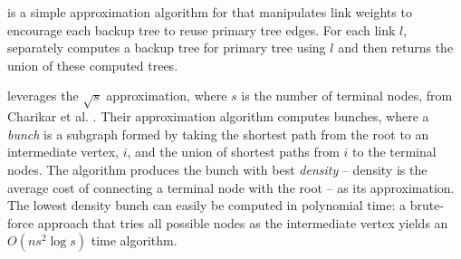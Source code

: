 \steiner is a simple approximation algorithm for \mc that manipulates link weights to encourage each backup tree to reuse primary tree edges.
For each link $l$,  \steiner separately computes a backup tree for primary tree using $l$ and then returns the union of these computed trees. 


\steiner leverages the $\sqrt{s}$ \arbor approximation, where $s$ is the number of terminal nodes, from Charikar et al. \cite{Charikar98}. Their approximation algorithm computes bunches, 
where a \emph{bunch} is a subgraph formed by taking the shortest path from the root to an intermediate vertex, $i$, and the union of shortest paths from $i$ to the terminal nodes.  
The algorithm produces the bunch with best \emph{density} -- density is the average cost of connecting a terminal node with the root -- as its approximation.   The lowest density bunch can 
easily be computed in polynomial time: a brute-force approach that tries all possible nodes as the intermediate vertex yields an $O(ns^2 \log s)$ time algorithm. 




